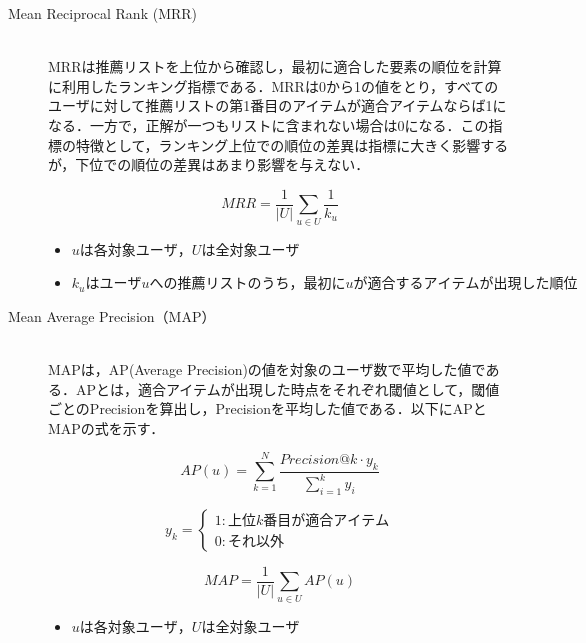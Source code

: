 \documentclass[12pt]{jarticle} %
\begin{document}
\begin{description}
\item[Mean Reciprocal Rank (MRR)]~\\
MRRは推薦リストを上位から確認し，最初に適合した要素の順位を計算に利用したランキング指標である．MRRは0から1の値をとり，すべてのユーザに対して推薦リストの第1番目のアイテムが適合アイテムならば1になる．一方で，正解が一つもリストに含まれない場合は0になる．この指標の特徴として，ランキング上位での順位の差異は指標に大きく影響するが，下位での順位の差異はあまり影響を与えない．

\[
  MRR =
  \frac{1}{|U|}\sum_{u\in U} \frac{1}{k_u}
\]
\begin{itemize}
\item $uは各対象ユーザ，Uは全対象ユーザ$
\item $k_uはユーザuへの推薦リストのうち，最初にuが適合するアイテムが出現した順位$
\end{itemize}


\item[Mean Average Precision（MAP）]~\\
MAPは，AP(Average Precision)の値を対象のユーザ数で平均した値である．APとは，適合アイテムが出現した時点をそれぞれ閾値として，閾値ごとのPrecisionを算出し，Precisionを平均した値である．以下にAPとMAPの式を示す．

\[
  AP(u) =
  \sum_{k=1}^{N} \frac{Precision@k \cdot y_k}{\sum_{i=1}^{k}y_i}
\]

\[
  y_k = \begin{cases}
    1 : 上位k番目が適合アイテム \\
    0 : それ以外
  \end{cases}
\]

\[
  MAP =
  \frac{1}{|U|}\sum_{u\in U} AP(u)
\]
\begin{itemize}
\item $uは各対象ユーザ，Uは全対象ユーザ$
\end{itemize}

\end{description}
\end{document}

